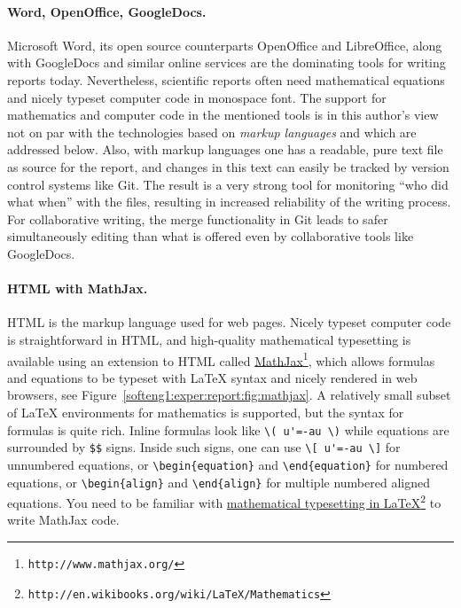 \documentclass[graybox,sectrefs,envcountresetchap,open=right,final]{svmonodo}
\begin{document}

\paragraph{Word, OpenOffice, GoogleDocs.}
Microsoft Word, its open source counterparts OpenOffice and
LibreOffice, along with GoogleDocs and similar online services are the
dominating tools for writing reports today. Nevertheless, scientific
reports often need mathematical equations and nicely typeset computer
code in monospace font. The support for mathematics and computer code
in the mentioned tools is in this author's view not on par with the
technologies based on \emph{markup languages} and which are addressed
below. Also, with markup languages one has a readable, pure text file
as source for the report, and changes in this text can easily be
tracked by version control systems like Git. The result is a very
strong tool for monitoring ``who did what when'' with the files,
resulting in increased reliability of the writing process. For
collaborative writing, the merge functionality in Git leads to safer
simultaneously editing than what is offered even by collaborative
tools like GoogleDocs.




\paragraph{HTML with MathJax.}
HTML is the markup language used for web pages.  Nicely typeset computer
code is straightforward in HTML, and high-quality mathematical
typesetting is available using an extension to HTML called \href{{http://www.mathjax.org/}}{MathJax}\footnote{\texttt{http://www.mathjax.org/}}, which allows formulas and equations to be
typeset with {\LaTeX} syntax and nicely rendered in web browsers, see
Figure~\ref{softeng1:exper:report:fig:mathjax}.  A relatively small
subset of {\LaTeX} environments for mathematics is supported, but the
syntax for formulas is quite rich. Inline formulas look like \Verb!\( u'=-au \)! while equations are surrounded by \Verb!$$! signs.  Inside such
signs, one can use \Verb!\[ u'=-au \]! for unnumbered equations, or
\Verb!\begin{equation}! and \Verb!\end{equation}! for
numbered equations, or \Verb!\begin{align}! and \Verb!\end{align}! for multiple
numbered aligned equations.  You need to be familiar with \href{{http://en.wikibooks.org/wiki/LaTeX/Mathematics}}{mathematical
typesetting in LaTeX}\footnote{\texttt{http://en.wikibooks.org/wiki/LaTeX/Mathematics}} to write MathJax
code.
\end{document}
